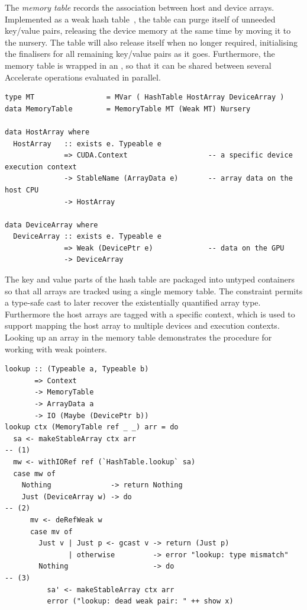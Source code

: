The \emph{memory table} records the association between host and device arrays.
Implemented as a weak hash table~\cite{PeytonJones:2000ks}, the table can purge
itself of unneeded key/value pairs, releasing the device memory at the same time
by moving it to the nursery. The table will also release itself when no longer
required, initialising the finalisers for all remaining key/value pairs as it
goes. Furthermore, the memory table is wrapped in an , so that it can
be shared between several Accelerate operations evaluated in parallel.
%
\begin{lstlisting}[style=haskell]
type MT                 = MVar ( HashTable HostArray DeviceArray )
data MemoryTable        = MemoryTable MT (Weak MT) Nursery

data HostArray where
  HostArray   :: exists e. Typeable e
              => CUDA.Context                   -- a specific device execution context
              -> StableName (ArrayData e)       -- array data on the host CPU
              -> HostArray

data DeviceArray where
  DeviceArray :: exists e. Typeable e
              => Weak (DevicePtr e)             -- data on the GPU
              -> DeviceArray
\end{lstlisting}
%
The key and value parts of the hash table are packaged into untyped containers
so that all arrays are tracked using a single memory table. The 
constraint permits a type-safe cast to later recover the existentially
quantified array type. Furthermore the host arrays are tagged with a specific
\CUDA context, which is used to support mapping the host array to multiple
devices and execution contexts. Looking up an array in the memory table
demonstrates the procedure for working with weak pointers.
%
\begin{lstlisting}[style=haskell]
lookup :: (Typeable a, Typeable b)
       => Context
       -> MemoryTable
       -> ArrayData a
       -> IO (Maybe (DevicePtr b))
lookup ctx (MemoryTable ref _ _) arr = do
  sa <- makeStableArray ctx arr                                         -- (1)
  mw <- withIORef ref (`HashTable.lookup` sa)
  case mw of
    Nothing              -> return Nothing
    Just (DeviceArray w) -> do                                          -- (2)
      mv <- deRefWeak w
      case mv of
        Just v | Just p <- gcast v -> return (Just p)
               | otherwise         -> error "lookup: type mismatch"
        Nothing                    -> do                                -- (3)
          sa' <- makeStableArray ctx arr
          error ("lookup: dead weak pair: " ++ show x)
\end{lstlisting}
